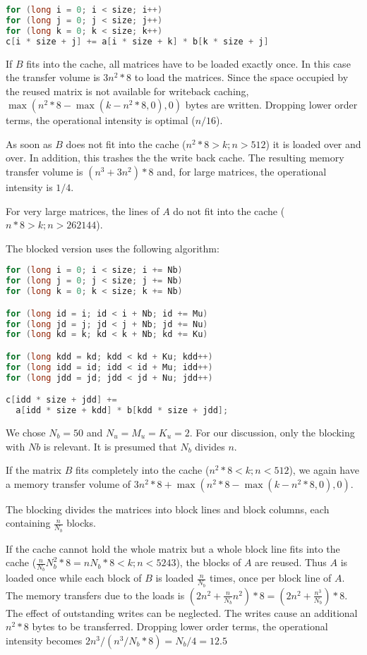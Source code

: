 \documentclass[a4paper,12pt]{article}
\begin{document}
\begin{lstlisting}[language=C] 
for (long i = 0; i < size; i++) 
for (long j = 0; j < size; j++) 
for (long k = 0; k < size; k++) 
c[i * size + j] += a[i * size + k] * b[k * size + j]
\end{lstlisting}

If $B$ fits into the cache, all matrices have to be loaded exactly once. In this
case the transfer volume is $3n^2*8$ to load the matrices. Since the space
occupied by the reused matrix is not available for writeback caching,
$\max(n^2*8-\max(k-n^2*8,0),0)$ bytes are written. Dropping lower order terms,
the operational intensity is optimal ($n/16$). 

As soon as $B$ does not fit into the cache ($n^2*8>k;n>512$) it is loaded over
and over. In addition, this trashes the the write back cache. The resulting
memory transfer volume is $(n^3+3n^2)*8$ and, for large matrices, the
operational intensity is $1/4$.

For very large matrices, the lines of $A$ do not fit into the cache 
($n*8>k;n>262144$). 
 
The blocked version uses the following algorithm:

\begin{lstlisting}[language=C] 
for (long i = 0; i < size; i += Nb)
for (long j = 0; j < size; j += Nb)
for (long k = 0; k < size; k += Nb)

for (long id = i; id < i + Nb; id += Mu)
for (long jd = j; jd < j + Nb; jd += Nu)
for (long kd = k; kd < k + Nb; kd += Ku)

for (long kdd = kd; kdd < kd + Ku; kdd++)
for (long idd = id; idd < id + Mu; idd++)
for (long jdd = jd; jdd < jd + Nu; jdd++)

c[idd * size + jdd] += 
  a[idd * size + kdd] * b[kdd * size + jdd];
\end{lstlisting}

We chose $N_b=50$ and $N_u=M_u=K_u=2$.
For our discussion, only the blocking with $Nb$ is relevant. It is presumed that
$N_b$ divides $n$. 

If the matrix $B$ fits completely into the cache ($n^2*8<k;n<512$), we again
have a memory transfer volume of $3n^2*8+\max(n^2*8-\max(k-n^2*8,0),0)$. 

The blocking divides the matrices into block lines and block columns, each
containing $\frac{n}{N_b}$ blocks.

If the cache cannot hold the whole matrix but a whole block line fits into the
cache ($\frac{n}{N_b}N_b^2*8=nN_b*8<k;n<5243$), the blocks of $A$ are reused.
Thus $A$ is loaded once while each block of $B$ is loaded $\frac{n}{N_b}$ times,
once per block line of $A$. The memory transfers due to the loads is
$(2n^2+\frac{n}{N_b}n^2)*8=(2n^2+\frac{n^3}{N_b})*8$. The effect of outstanding
writes can be neglected. The writes cause an additional $n^2*8$ bytes to be
transferred. Dropping lower order terms, the operational intensity becomes
$2n^3/(n^3/N_b*8)=N_b/4=12.5$
\end{document}
